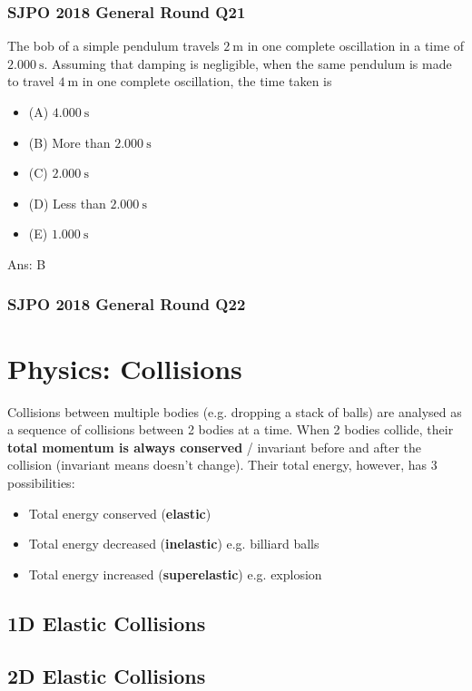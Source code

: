 \documentclass{article}
\begin{document}
\begin{samepage}
\subsubsection{SJPO 2018 General Round Q21}
The bob of a simple pendulum travels $2 \mathrm{~m}$ in one complete oscillation in a time of $2.000 \mathrm{~s}$. Assuming that damping is negligible, when the same pendulum is made to travel $4 \mathrm{~m}$ in one complete oscillation, the time taken is
\begin{itemize}
\item[](A) $4.000 \mathrm{~s}$
\item[](B) More than $2.000 \mathrm{~s}$
\item[](C) $2.000 \mathrm{~s}$
\item[](D) Less than $2.000 \mathrm{~s}$
\item[](E) $1.000 \mathrm{~s}$
\end{itemize}
Ans: \ifpaper B \fi 
\end{samepage}
\begin{samepage}
\subsubsection{SJPO 2018 General Round Q22}

\end{samepage}
\section{Physics: Collisions}
Collisions between multiple bodies (e.g. dropping a stack of balls) are analysed as a sequence of collisions between 2 bodies at a time. When 2 bodies collide, their \textbf{total momentum is always conserved} / invariant before and after the collision (invariant means doesn't change). Their total energy, however, has 3 possibilities:
\begin{itemize}
    \item Total energy conserved (\textbf{elastic})
    \item Total energy decreased (\textbf{inelastic}) e.g. billiard balls
    \item Total energy increased (\textbf{superelastic}) e.g. explosion
\end{itemize}
\subsection{1D Elastic Collisions}
\subsection{2D Elastic Collisions}
\end{document}
